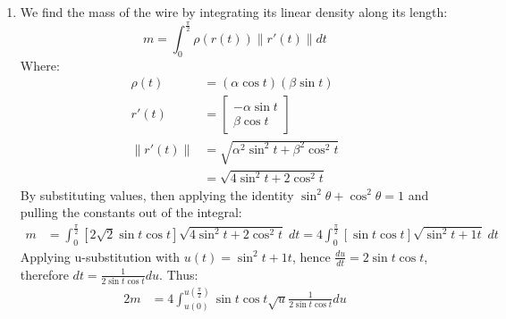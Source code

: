 \documentclass[a4paper, 11pt]{article}
\newcommand{\RR}{\mathbb{R}}
\def\set#1{\left\{ #1 \right\}}
\begin{document}
\begin{enumerate}[label=(\alph*)]




  \item We find the mass of the wire by integrating its linear density along its length:
        $$m = \int_0^{\frac{\pi}2}\rho(r(t))\|r'(t)\|dt$$
        Where:
        \begin{align*}
          \rho(t)   & =\left( \alpha\cos t \right)\left( \beta\sin t  \right) \\
          r'(t)     & = \begin{bmatrix}
                          -\alpha\sin t \\
                          \beta \cos t
                        \end{bmatrix}                                        \\
          \|r'(t)\| & = \sqrt{\alpha^2\sin^2t + \beta^2\cos^2 t}              \\
                    & =\sqrt{4\sin^2t + 2\cos^2 t}
        \end{align*}
        By substituting values, then applying the identity $\sin^2\theta+\cos^2\theta=1$ and pulling the constants out of the integral:
        \begin{align*}
          m & = \int_0^{\frac{\pi}2} \left[ 2\sqrt 2\sin t \cos t  \right]\sqrt{4\sin^2t + 2\cos^2 t}\;dt
          =4 \int_0^{\frac{\pi}2} \left[ \sin t \cos t  \right]\sqrt{\sin^2t + 1 t}\;dt
        \end{align*}
        Applying u-substitution with $u(t)=\sin^2t + 1 t$, hence $\frac{du}{dt} = 2\sin t \cos t$, therefore $dt= \frac{1}{2\sin t \cos t}du$. Thus:
        \begin{alignat*}{2}
          m & = 4 \int_{u(0)}^{u(\frac{\pi}2)}  \sin t \cos t  \sqrt{u}\frac{1}{2\sin t\cos t }du                                                \\

\end{alignat*}
\end{enumerate}
\end{document}
